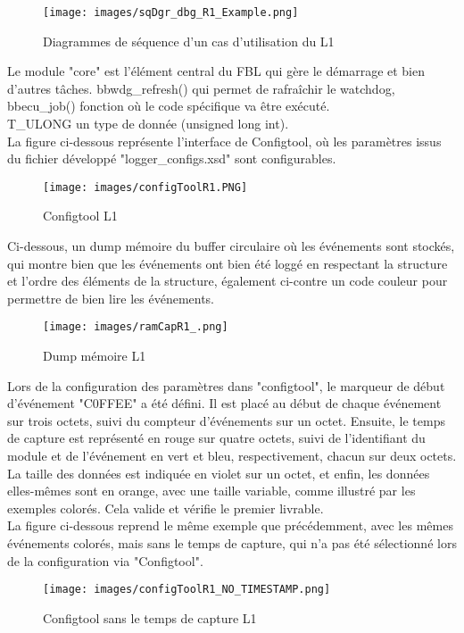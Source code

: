 \documentclass[a4paper, 12pt]{report}
\begin{document}
    \begin{figure}[H]
            \centering
        \texttt{[image: images/sqDgr\_dbg\_R1\_Example.png]}
            \caption{Diagrammes de séquence d'un cas d'utilisation du L1}
            \label{fig:can}
    \end{figure}
Le module "core" est l'élément central du FBL qui gère le démarrage et bien d'autres tâches. {\color{green}bbwdg\_refresh}() qui permet de rafraîchir le watchdog, {\color{green}bbecu\_job}()
fonction où le code spécifique va être exécuté.\\
{\color{purple}T\_ULONG} un type de donnée (unsigned long int).\\

La figure ci-dessous représente l'interface de Configtool, où les paramètres issus du fichier développé "logger\_configs.xsd" sont configurables.

    \begin{figure}[H]
       \centering
       \texttt{[image: images/configToolR1.PNG]}
       \caption{Configtool L1}
       \label{fig:confToolL1}
   \end{figure}

   Ci-dessous, un dump mémoire du buffer circulaire où les événements sont stockés, qui montre bien que les événements ont bien été loggé en respectant la structure et l'ordre des éléments de la structure, également ci-contre un code couleur pour permettre de bien lire les événements.
   \begin{figure}[H]
       \centering
       \texttt{[image: images/ramCapR1\_.png]}
       \caption{Dump mémoire L1}
       \label{fig:dumpMemL1}
   \end{figure}

    Lors de la configuration des paramètres dans "configtool", le marqueur de début d'événement "C0FFEE" a été défini. Il est placé au début de chaque événement sur trois octets, suivi du compteur d'événements sur un octet. Ensuite, le temps de capture est représenté en rouge sur quatre octets, suivi de l'identifiant du module et de l'événement en vert et bleu, respectivement, chacun sur deux octets. La taille des données est indiquée en violet sur un octet, et enfin, les données elles-mêmes sont en orange, avec une taille variable, comme illustré par les exemples colorés. Cela valide et vérifie le premier livrable.\\
    


La figure ci-dessous reprend le même exemple que précédemment, avec les mêmes événements colorés, mais sans le temps de capture, qui n'a pas été sélectionné lors de la configuration via "Configtool".
    \begin{figure}[H]
       \centering
       \texttt{[image: images/configToolR1\_NO\_TIMESTAMP.png]}
       \caption{Configtool sans le temps de capture L1}
       \label{fig:confToolL1}
   \end{figure}
   
\end{document}
